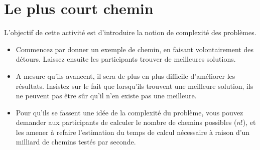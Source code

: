 \documentclass[a5paper,pagesize,DIV=14]{scrbook}
\begin{document}
\section*{Le plus court chemin}

L'objectif de cette activité est d'introduire la notion de complexité des problèmes.

\begin{itemize}
  \item Commencez par donner un exemple de chemin, en faisant volontairement des détours. Laissez ensuite les participants trouver de meilleures solutions. 
  \item A mesure qu'ils avancent, il sera de plus en plus difficile d'améliorer les résultats. Insistez sur le fait que lorsqu'ils trouvent une meilleure solution, ils ne peuvent pas être sûr qu'il n'en existe pas une meilleure.
  \item Pour qu'ils se fassent une idée de la complexité du problème, vous pouvez demander aux participants de calculer le nombre de chemins possibles ($n!$), et les amener à refaire l'estimation du temps de calcul nécessaire à raison d'un milliard de chemins testés par seconde.
\end{itemize}
\end{document}
